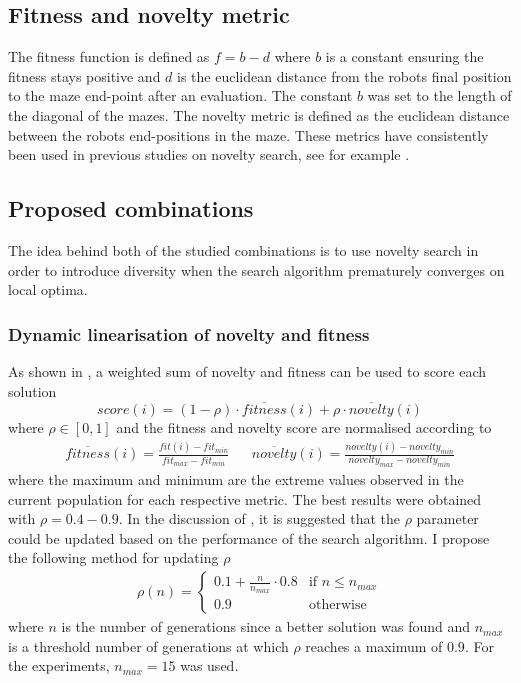 \subsection{Fitness and novelty metric}
The fitness function is defined as $f = b - d$ where $b$ is a constant ensuring the fitness stays positive
and $d$ is the euclidean distance from the robots final position to the maze end-point after an evaluation.
The constant $b$ was set to the length of the diagonal of the mazes.
The novelty metric is defined as the euclidean distance between the robots end-positions in the maze.
These metrics have consistently been used in previous studies on novelty search, see for example \cite{ns_study,novelty_alone}.

\subsection{Proposed combinations}
The idea behind both of the studied combinations is to use novelty search in order to introduce diversity
when the search algorithm prematurely converges on local optima.

\subsubsection{Dynamic linearisation of novelty and fitness}
As shown in \cite{novelty_not_enough}, a weighted sum of novelty and fitness can be used to score each solution
\[
    score(i) = (1-\rho) \cdot \overline{fitness}(i) + \rho \cdot \overline{novelty}(i)
\]
where $\rho \in [0,1]$ and the fitness and novelty score are normalised according to
\begin{align*}
    \overline{fitness}(i) =  \frac{fit(i) - fit_{min}}{fit_{max} - fit_{min}} && \overline{novelty}(i) =  \frac{novelty(i) - novelty_{min}}{novelty_{max} - novelty_{min}}
\end{align*}
where the maximum and minimum are the extreme values observed in the current population for each respective metric.
The best results were obtained with $\rho=0.4-0.9$. In the discussion of \cite{novelty_not_enough}, it is suggested
that the $\rho$ parameter could be updated based on the performance of the search algorithm. I propose the following
method for updating $\rho$
\begin{align*}
    \rho(n) =
        \begin{cases}
            0.1 + \frac{n}{n_{max}} \cdot 0.8 & \text{if $n \leq n_{max}$}\\
            0.9 & \text{otherwise}
        \end{cases}
\end{align*}
where $n$ is the number of generations since a better solution was found and
$n_{max}$ is a threshold number of generations at which $\rho$ reaches a maximum
of $0.9$. For the experiments, $n_{max}=15$ was used.


